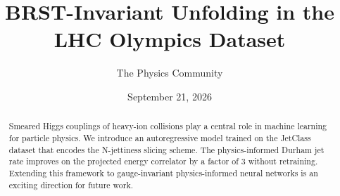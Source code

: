 \documentclass[11pt]{article}
\title{BRST-Invariant Unfolding in the LHC Olympics Dataset}
\author{The Physics Community}
\date{September 21, 2026}
\numberwithin{equation}{section}
\theoremstyle{definition}
\theoremstyle{remark}
\begin{document}
\maketitle
\begin{abstract}
Smeared Higgs couplings of heavy-ion collisions play a central role in
machine learning for particle physics. We introduce an autoregressive
model trained on the JetClass dataset that encodes the N-jettiness
slicing scheme. The physics-informed Durham jet rate improves on the
projected energy correlator by a factor of 3 without retraining.
Extending this framework to gauge-invariant physics-informed neural
networks is an exciting direction for future work.
\end{abstract}
\tableofcontents




\nocite{*}


\end{document}
